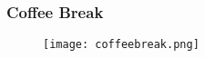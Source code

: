 \beginbackup

\begin{frame}[c]\frametitle{Coffee Break}
  \begin{figure}[htbp]
    \centering
    \texttt{[image: coffeebreak.png]}
  \end{figure}
\end{frame}

\backupend

